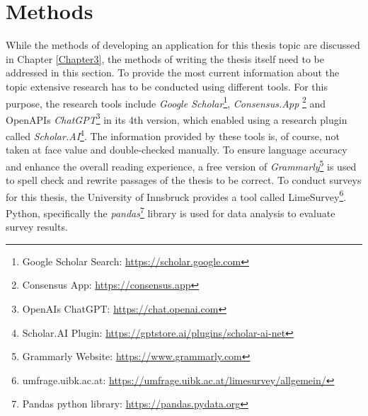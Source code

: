 \section{Methods} \label{introduction-methods}

While the methods of developing an application for this thesis topic are discussed
in Chapter \ref{Chapter3}, the methods of writing the thesis itself need 
to be addressed in this section.
To provide the most current information about the topic extensive 
research has to be conducted using different tools.
For this purpose, the research tools include 
\textit{Google Scholar}\footnote{Google Scholar Search: \url{https://scholar.google.com}}, 
\textit{Consensus.App} \footnote{Consensus App: \url{https://consensus.app}} and OpenAPIs 
\textit{ChatGPT}\footnote{OpenAIs ChatGPT: \url{https://chat.openai.com}} in its 4th version, which 
enabled using a research plugin called 
\textit{Scholar.AI}\footnote{Scholar.AI Plugin: \url{https://gptstore.ai/plugins/scholar-ai-net}}.
The information provided by these tools is,
of course, not taken at face value and double-checked manually. 
To ensure language accuracy and enhance the overall reading experience, a free version of 
\textit{Grammarly}\footnote{Grammarly Website: \url{https://www.grammarly.com}} is 
used to spell check and rewrite passages
of the thesis to be correct.
To conduct surveys for this thesis, the University of Innsbruck provides a tool called
LimeSurvey\footnote{umfrage.uibk.ac.at: \url{https://umfrage.uibk.ac.at/limesurvey/allgemein/}}.
Python, specifically the \textit{pandas}\footnote{Pandas python library: \url{https://pandas.pydata.org}} 
library is used for data analysis to evaluate survey results.

